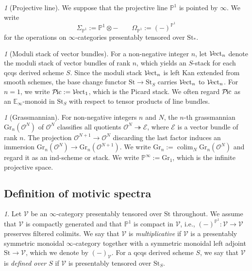 \documentclass{amsart}
\theoremstyle{plain}
\theoremstyle{definition}
\theoremstyle{remark}
\newtheorem{p}[theorem]{}
\numberwithin{equation}{theorem}
\newcommand{\mcal}[1]{\mathcal{#1}}
\newcommand{\mbb}[1]{\mathbb{#1}}
\newcommand{\Gr}{\mathrm{Gr}}
\newcommand{\St}{\mathrm{St}}
\newcommand{\V}{\mathcal{V}}
\newcommand{\OmegaP}{\Omega_{\mathbb{P}^1}}
\newcommand{\SigmaP}{\Sigma_{\mathbb{P}^1}}
\newcommand{\Pic}{{\mathcal{P}\mspace{-2.0mu}\mathrm{ic}}}
\newcommand{\Vect}{{\mathcal{V}\mspace{-2.0mu}\mathrm{ect}}}
\newcommand{\colim}{\operatorname*{colim}}
\begin{document}
\begin{p}[Projective line]
We suppose that the projective line $\mbb{P}^1$ is pointed by $\infty$.
We write
\[
	\SigmaP:=\mbb{P}^1\otimes- \qquad
	\OmegaP:=(-)^{\mbb{P}^1}
\]
for the operations on $\infty$-categories presentably tensored over $\St_*$.
\end{p}

\begin{p}[Moduli stack of vector bundles]
For a non-negative integer $n$, let $\Vect_n$ denote the moduli stack of vector bundles of rank $n$, which yields an $S$-stack for each qcqs derived scheme $S$.
Since the moduli stack $\Vect_n$ is left Kan extended from smooth schemes, the base change functor $\St\to\St_S$ carries $\Vect_n$ to $\Vect_n$.
For $n=1$, we write $\Pic:=\Vect_1$, which is the Picard stack.
We often regard $\Pic$ as an $\mbb{E}_\infty$-monoid in $\St_S$ with respect to tensor products of line bundles.
\end{p}

\begin{p}[Grassmannian]
For non-negative integers $n$ and $N$, the $n$-th grassmannian $\Gr_n(\mcal{O}^N)$ of $\mcal{O}^N$ classifies all quotients $\mcal{O}^N\twoheadrightarrow\mcal{E}$, where $\mcal{E}$ is a vector bundle of rank $n$.
The projection $\mcal{O}^{N+1}\to\mcal{O}^N$ discarding the last factor induces an immersion $\Gr_n(\mcal{O}^N)\to\Gr_n(\mcal{O}^{N+1})$.
We write $\Gr_n:=\colim_N\Gr_n(\mcal{O}^N)$ and regard it as an ind-scheme or stack.
We write $\mbb{P}^\infty:=\Gr_1$, which is the infinite projective space.
\end{p}


\subsection{Definition of motivic spectra}\label{DMS}

\begin{p}\label{p:DMS}
Let $\V$ be an $\infty$-category presentably tensored over $\St$ throughout.
We assume that $\V$ is compactly generated and that $\mbb{P}^1$ is compact in $\V$, i.e., $(-)^{\mbb{P}^1}\colon\V\to\V$ preserves filtered colimits.
We say that $\V$ is \textit{multiplicative} if $\V$ is a presentably symmetric monoidal $\infty$-category together with a symmetric monoidal left adjoint $\St\to\V$, which we denote by $(-)_\V$.
For a qcqs derived scheme $S$, we say that $\V$ is \textit{defined over $S$} if $\V$ is presentably tensored over $\St_S$.
\end{p}
\end{document}

